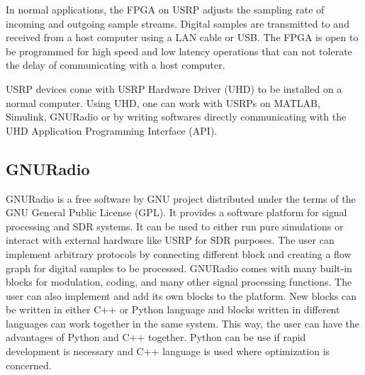 In normal applications, the FPGA on USRP adjusts the sampling rate of incoming and outgoing sample streams. Digital samples are transmitted to and received from a host computer using a LAN cable or USB. The FPGA is open to be programmed for high speed and low latency operations that can not tolerate the delay of communicating with a host computer.

USRP devices come with USRP Hardware Driver (UHD) to be installed on a normal computer. Using UHD, one can work with USRPs on MATLAB, Simulink, GNURadio or by writing softwares directly communicating with the UHD Application Programming Interface (API).


\subsection{GNURadio}

GNURadio is a free software by GNU project distributed under the terms of the GNU General Public License (GPL). It provides a software platform for signal processing and SDR systems. It can be used to either run pure simulations or interact with external hardware like USRP for SDR purposes. The user can implement arbitrary protocols by connecting different block and creating a flow graph for digital samples to be processed. GNURadio comes with many built-in blocks for modulation, coding, and many other signal processing functions. The user can also implement and add its own blocks to the platform. New blocks can be written in either C++ or Python language and blocks written in different languages can work together in the same system. This way, the user can have the advantages of Python and C++ together. Python can be use if rapid development is necessary and C++ language is used where optimization is concerned.